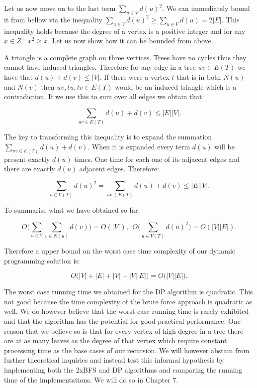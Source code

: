 Let us now move on to the last term $\sum_{u \in V}{d(u)^2}$. We can immediately bound it from bellow via the inequality $ \sum_{u \in V}{d(u)^2} \ge \sum_{u \in V}{d(u)} = 2|E|$. This inequality holds because the degree of a vertex is a positive integer and for any $x \in Z^+$ $ x^2 \ge x$. Let us now show how it can be bounded from above.

A triangle is a complete graph on three vertices. Trees have no cycles thus they cannot have induced triangles. Therefore for any edge in a tree $uv \in E(T)$ we have that $d(u) + d(v) \le |V|$. If there were a vertex $t$ that is in both $N(u)$ and $N(v)$ then $uv, tu, tv \in E(T)$ would be an induced triangle which is a contradiction. If we use this to sum over all edges we obtain that:

$$ \sum_{uv \in E(T)}{d(u) + d(v)} \le |E||V|. $$

The key to transforming this inequality is to expand the summation $\sum_{uv \in E(T)}{d(u) + d(v)}$. When it is expanded every term $d(u)$ will be present exactly $d(u)$ times. One time for each one of its adjacent edges and there are exactly $d(u)$ adjacent edges. Therefore:

$$ \sum_{u \in V(T)}{d(u)^2} = \sum_{uv \in E(T)}{d(u) + d(v)} \le |E||V| .$$

To summarise what we have obtained so far:

$$ O\bigg( \sum_{u \in V}{\sum_{v \in N(u)}{d(v)}} \bigg) = O(|V|)  , ~~ O\bigg( \sum_{u \in V(T)}{d(u)^2} \bigg) = O(|V||E|).$$

Therefore a upper bound on the worst case time complexity of our dynamic programming solution is:

$$ O\big( |V| + |E| + |V| + |V||E|  \big) = O\big(|V||E|\big).$$

The worst case running time we obtained for the DP algorithm is quadratic. This not good because the time complexity of the brute force approach is quadratic as well. We do however believe that the worst case running time is rarely exhibited and that the algorithm has the potential for good practical performance. One reason that we believe so is that for every vertex of high degree in a tree there are at as many leaves as the degree of that vertex which require constant processing time as the base cases of our recursion. We will however abstain from further theoretical inquiries and instead test this informal hypothesis by implementing both the 2xBFS and DP algorithms and comparing the running time of the implementations. We will do so in Chapter 7.

